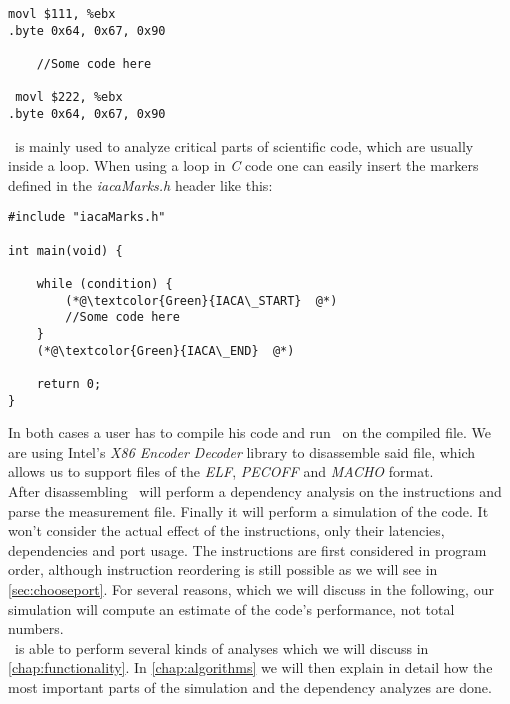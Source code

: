 \begin{mdframed}[backgroundcolor=light-gray, roundcorner=10pt,leftmargin=1, rightmargin=1, innerleftmargin=15, innertopmargin=1,innerbottommargin=1, outerlinewidth=1, linecolor=light-gray]
\begin{lstlisting}[language={myLang}]
 movl $111, %ebx
.byte 0x64, 0x67, 0x90

    //Some code here
    
 movl $222, %ebx
.byte 0x64, 0x67, 0x90
\end{lstlisting}
\end{mdframed}

\iaca\ is mainly used to analyze critical parts of scientific code, which are usually inside a loop. When using a loop in \emph{C} code one can easily insert the markers defined in the \emph{iacaMarks.h} header like this:

\begin{mdframed}[backgroundcolor=light-gray, roundcorner=10pt,leftmargin=1, rightmargin=1, innerleftmargin=15, innertopmargin=1,innerbottommargin=1, outerlinewidth=1, linecolor=light-gray]
\begin{lstlisting}
#include "iacaMarks.h"

int main(void) {

    while (condition) {
        (*@\textcolor{Green}{IACA\_START}  @*)
        //Some code here
    }
    (*@\textcolor{Green}{IACA\_END}  @*)

    return 0;
}
\end{lstlisting}
\end{mdframed}

In both cases a user has to compile his code and run \suaca\ on the compiled file. We are using Intel's \emph{X86 Encoder Decoder
} library \cite{xed} to disassemble said file, which allows us to support files of the \emph{ELF}, \emph{PECOFF} and \emph{MACHO} format.\\
After disassembling \suaca\ will perform a dependency analysis on the instructions and parse the measurement file. Finally it will perform a simulation of the code. It won't consider the actual effect of the instructions, only their latencies, dependencies and port usage. The instructions are first considered in program order, although instruction reordering is still possible as we will see in \autoref{sec:chooseport}. For several reasons, which we will discuss in the following, our simulation will compute an estimate of the code's performance, not total numbers.\\
\suaca\ is able to perform several kinds of analyses which we will discuss in \autoref{chap:functionality}. In \autoref{chap:algorithms} we will then explain in detail how the most important parts of the simulation and the dependency analyzes are done.


